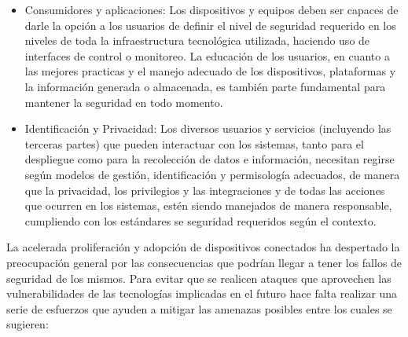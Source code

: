 \begin{itemize}
\item Consumidores y aplicaciones: Los dispositivos y equipos deben ser capaces de darle la opción a los usuarios de definir el nivel de seguridad requerido en los niveles de toda la infraestructura tecnológica utilizada, haciendo uso de interfaces de control o monitoreo. La educación de los usuarios, en cuanto a las mejores practicas y el manejo adecuado de los dispositivos, plataformas y la información generada o almacenada, es también parte fundamental para mantener la seguridad en todo momento.
\item Identificación y Privacidad: Los diversos usuarios y servicios (incluyendo las terceras partes) que pueden interactuar con los sistemas, tanto para el despliegue como para la recolección de datos e información, necesitan regirse según modelos de gestión, identificación y permisología adecuados, de manera que la privacidad, los privilegios y las integraciones y de todas las acciones que ocurren en los sistemas, estén siendo manejados de manera responsable, cumpliendo con los estándares se seguridad requeridos según el contexto.  
\end{itemize}

La acelerada proliferación y adopción de dispositivos conectados ha despertado la preocupación general por las consecuencias que podrían llegar a tener los fallos de seguridad de los mismos. Para evitar que se realicen ataques que aprovechen las vulnerabilidades de las tecnologías implicadas en el futuro hace falta realizar una serie de esfuerzos\cite{dhsiot} que ayuden a mitigar las amenazas posibles entre los cuales se sugieren:

